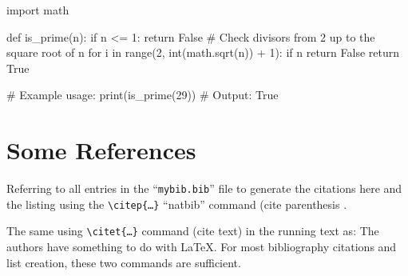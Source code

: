 \documentclass[ms-thesis,mathdesign,chpterrefs,showgrid]{ndsu-thesis-tagged}%
\begin{document}

\begin{mytlisting}[fontsize=\small, frame=single, numbers=left]
import math

def is_prime(n):
    if n <= 1:
        return False
    # Check divisors from 2 up to the square root of n
    for i in range(2, int(math.sqrt(n)) + 1):
        if n %
            return False
    return True

# Example usage:
print(is_prime(29))  # Output: True
\end{mytlisting}

\repText[75]

\mysectop
\section{Some References}
Referring to all entries in the ``\texttt{mybib.bib}'' file to generate the citations here and the listing using the \texttt{\textbackslash citep\{\ldots\}} ``natbib'' command (cite parenthesis \citep{texbook,lcompanion,latex2e,knuth1984,lesk1977,amsthm2017,calvo2004using,cannayen2011latex,kopka2004guide,notso2021,bari2016identification}.

The same using \texttt{\textbackslash citet\{\ldots\}} command (cite text) in the running text as: The authors \citet{texbook,lcompanion,latex2e,knuth1984,lesk1977,amsthm2017,calvo2004using,cannayen2011latex,kopka2004guide,notso2021,bari2016identification} have something to do with \LaTeX. For most bibliography citations and list creation, these two commands are sufficient.

\checkEndRefsection%



\end{document}
